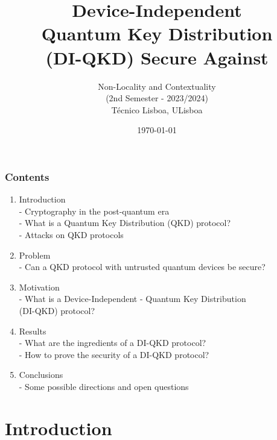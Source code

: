 \documentclass{beamer}
\title{{Device-Independent}\\{Quantum Key Distribution}\\{(DI-QKD) Secure Against}\\\vspace{0.25ex}{Collective Attacks}}
\subtitle{Non-Locality and Contextuality\\ (2nd Semester - 2023/2024)\\\vspace{-0.75ex} T\'{e}cnico Lisboa, ULisboa}
\author[R.\,A.\,Barreiro]
{%
    \texorpdfstring{
        \begin{columns}
            \column{\linewidth}
            \centering
            {R\'{u}ben Andr\'{e} Barreiro}\\
            \href{mailto:ruben.andre.letra.barreiro@tecnico.ulisboa.pt}{\color{blue}\footnotesize ruben.andre.letra.barreiro@tecnico.ulisboa.pt}
        \end{columns}
    }
    {R\'{u}ben Andr\'{e} Barreiro}
}
\date{\today}
\begin{document}
	\setcounter{showProgressBar}{0}
	\setcounter{showSlideNumbers}{0}

	\frame{\titlepage}

	\begin{frame}
		\frametitle{Contents}
        
        \vspace{4.5ex}
		\begin{enumerate}
            \item Introduction \\ \textcolor{ExecusharesGrey}{\footnotesize\hspace{1em} - Cryptography in the post-quantum era\\\hspace{1em} - What is a Quantum Key Distribution (QKD) protocol?\\\vspace{-0.75ex}\hspace{1em} - Attacks on QKD protocols}
			\item Problem \\ \textcolor{ExecusharesGrey}{\footnotesize\hspace{1em} - Can a QKD protocol with untrusted quantum devices be secure?}
			\item Motivation \\ \textcolor{ExecusharesGrey}{\footnotesize\hspace{1em} - What is a Device-Independent - Quantum Key Distribution\\\hspace{1.5em} (DI-QKD) protocol?}
			\item Results \\ \textcolor{ExecusharesGrey}{\footnotesize\hspace{1em} - What are the ingredients of a DI-QKD protocol?\\\hspace{1em} - How to prove the security of a DI-QKD protocol?}
			\item Conclusions \\ \textcolor{ExecusharesGrey}{\footnotesize\hspace{1em} - Some possible directions and open questions}
		\end{enumerate}
	\end{frame}

	\setcounter{framenumber}{0}
	\setcounter{showProgressBar}{1}
	\setcounter{showSlideNumbers}{1}

    
	\section{Introduction}
 
\end{document}
